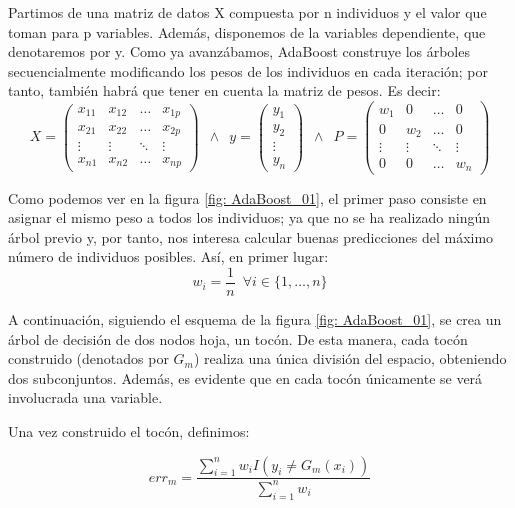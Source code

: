 \documentclass[12pt,twoside]{article}
\begin{document}
Partimos de una matriz de datos X compuesta por n individuos y el valor que toman para p variables. Además, disponemos de la variables dependiente, que denotaremos por y. Como ya avanzábamos, AdaBoost construye los árboles secuencialmente modificando los pesos de los individuos en cada iteración; por tanto, también habrá que tener en cuenta la matriz de pesos. Es decir:
\begin{equation*}
X =
\begin{pmatrix}
x_{11} & x_{12} & \dots & x_{1p} \\
x_{21} & x_{22} & \dots & x_{2p} \\
\vdots & \vdots & \ddots & \vdots \\
x_{n1} & x_{n2} & \dots & x_{np} 
\end{pmatrix}
\, \, \, 
\wedge
\, \, \,
y = 
\begin{pmatrix}
y_1 \\
y_2 \\
\vdots \\
y_n
\end{pmatrix}
\, \, \,
\wedge
\, \, \,
P =
\begin{pmatrix}
w_1 & 0 & \dots & 0 \\
0 & w_2 & \dots & 0 \\
\vdots & \vdots & \ddots & \vdots \\
0 & 0 & \dots & w_n
\end{pmatrix}
\end{equation*}

Como podemos ver en la figura \ref{fig: AdaBoost_01}, el primer paso consiste en asignar el mismo peso a todos los individuos; ya que no se ha realizado ningún árbol previo y, por tanto, nos interesa calcular buenas predicciones del máximo número de individuos posibles. Así, en primer lugar:
\begin{equation*}
w_i = \frac{1}{n} \, \, \, \forall i \in \{1, \dots, n \}
\end{equation*}

A continuación, siguiendo el esquema de la figura \ref{fig: AdaBoost_01}, se crea un árbol de decisión de dos nodos hoja, un tocón. De esta manera, cada tocón construido (denotados por $G_m$) realiza una única división del espacio, obteniendo dos subconjuntos. Además, es evidente que en cada tocón únicamente se verá involucrada una variable.

Una vez construido el tocón, definimos:

\begin{equation*}
err_m = \frac{\sum_{i=1}^{n} w_i I(y_i \neq G_m(x_i))}{\sum_{i=1}^{n} w_i} 
\end{equation*}
\end{document}

